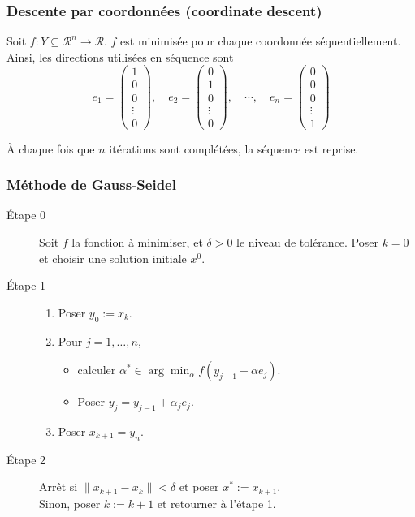 \documentclass[usepdftitle=false]{beamer}
\def\cR{\mathcal{R}}
\begin{document}
\begin{frame}
\frametitle{Descente par coordonnées (coordinate descent)}

Soit $f: Y \subseteq \cR^n \rightarrow \cR$.
$f$ est minimisée pour chaque coordonnée séquentiellement.
Ainsi, les directions utilisées en séquence sont
$$
e_1 = \begin{pmatrix} 1 \\ 0 \\ 0 \\ \vdots \\ 0 \end{pmatrix}, \quad
e_2 = \begin{pmatrix} 0 \\ 1 \\ 0 \\ \vdots \\ 0 \end{pmatrix}, \quad
\cdots, \quad
e_n = \begin{pmatrix} 0 \\ 0 \\ 0 \\ \vdots \\ 1 \end{pmatrix}
$$

À chaque fois que $n$ itérations sont complétées, la séquence est reprise.

\end{frame}

\begin{frame}
\frametitle{Méthode de Gauss-Seidel}

\begin{description}
\item[Étape 0]
Soit $f$ la fonction à minimiser, et $\delta > 0$ le niveau de tolérance.
Poser $k = 0$ et choisir une solution initiale $x^0$.
\item[Étape 1]
\begin{enumerate}
\item
Poser $y_0 := x_k$.
\item
Pour $j = 1,\ldots,n$,
\begin{itemize}
\item 
calculer $\alpha^* \in \arg\min_{\alpha} f(y_{j-1} + \alpha e_j)$.
\item
Poser $y_j = y_{j-1}+\alpha_j e_j$.
\end{itemize}
\item
Poser $x_{k+1} = y_n$.
\end{enumerate}
\item[Étape 2]
Arrêt si $\| x_{k + 1} - x_k \| < \delta$ et poser $x^* := x_{k+1}$.\\
Sinon, poser $k := k+1$ et retourner à l'étape 1.
\end{description}

\end{frame}
\end{document}
